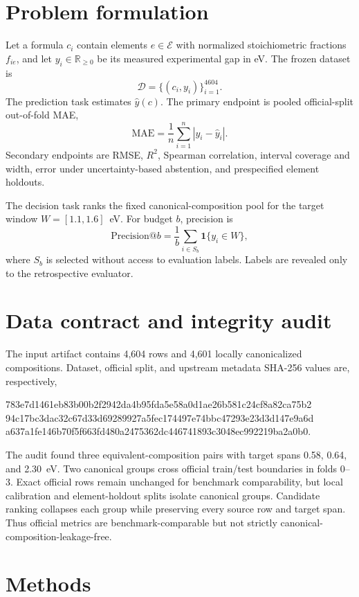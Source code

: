 \documentclass[11pt]{article}
\begin{document}
\section{Problem formulation}
Let a formula $c_i$ contain elements $e\in\mathcal{E}$ with normalized stoichiometric fractions $f_{ie}$, and let $y_i\in\mathbb{R}_{\ge 0}$ be its measured experimental gap in eV. The frozen dataset is
\[
\mathcal{D}=\{(c_i,y_i)\}_{i=1}^{4604}.
\]
The prediction task estimates $\hat y(c)$. The primary endpoint is pooled official-split out-of-fold MAE,
\[
\mathrm{MAE}=\frac{1}{n}\sum_{i=1}^n |y_i-\hat y_i|.
\]
Secondary endpoints are RMSE, $R^2$, Spearman correlation, interval coverage and width, error under uncertainty-based abstention, and prespecified element holdouts.

The decision task ranks the fixed canonical-composition pool for the target window $W=[1.1,1.6]$~eV. For budget $b$, precision is
\[
\mathrm{Precision@}b=\frac{1}{b}\sum_{i\in S_b}\mathbf{1}\{y_i\in W\},
\]
where $S_b$ is selected without access to evaluation labels. Labels are revealed only to the retrospective evaluator.

\section{Data contract and integrity audit}
The input artifact contains 4,604 rows and 4,601 locally canonicalized compositions. Dataset, official split, and upstream metadata SHA-256 values are, respectively,
\begin{center}
\small\ttfamily
783e7d1461eb83b00b2f2942da4b95fda5e58a0d1ae26b581c24cf8a82ca75b2\\
94c17bc3dac32c67d33d69289927a5fec174497e74bbc47293e23d3d147e9a6d\\
a637a1fe146b70f5f663fd480a2475362dc446741893c3048ec992219ba2a0b0.
\end{center}
The audit found three equivalent-composition pairs with target spans 0.58, 0.64, and 2.30~eV. Two canonical groups cross official train/test boundaries in folds 0--3. Exact official rows remain unchanged for benchmark comparability, but local calibration and element-holdout splits isolate canonical groups. Candidate ranking collapses each group while preserving every source row and target span. Thus official metrics are benchmark-comparable but not strictly canonical-composition-leakage-free.

\section{Methods}
\end{document}
